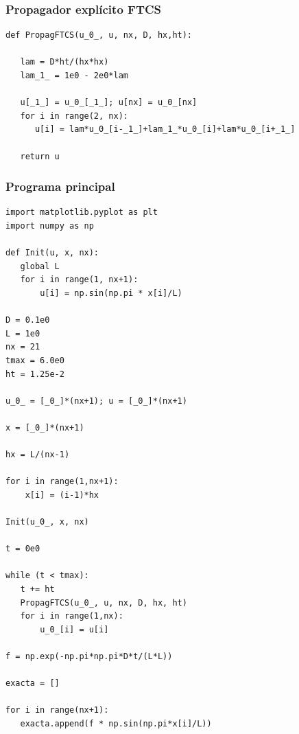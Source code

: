 \documentclass[12pt]{beamer}
\begin{document}
{
\begin{frame}[fragile]
\frametitle{Propagador explícito FTCS}
\begin{lstlisting}[caption=Propagador explícito FTCS para la ecuación de difusión, style=FormattedNumber, basicstyle=\linespread{1.1}\ttfamily=\small, columns=fullflexible]
def PropagFTCS(u_0_, u, nx, D, hx,ht):

   lam = D*ht/(hx*hx) 
   lam_1_ = 1e0 - 2e0*lam

   u[_1_] = u_0_[_1_]; u[nx] = u_0_[nx]
   for i in range(2, nx):
      u[i] = lam*u_0_[i-_1_]+lam_1_*u_0_[i]+lam*u_0_[i+_1_]
      
   return u
\end{lstlisting}
\end{frame}
\begin{frame}
\frametitle{Programa principal}
\begin{lstlisting}[caption=Programa principal para el ejercicio, style=FormattedNumber, basicstyle=\linespread{1.1}\ttfamily=\small, columns=fullflexible]
import matplotlib.pyplot as plt
import numpy as np

def Init(u, x, nx):
   global L
   for i in range(1, nx+1):
       u[i] = np.sin(np.pi * x[i]/L)

D = 0.1e0
L = 1e0
nx = 21
tmax = 6.0e0
ht = 1.25e-2

u_0_ = [_0_]*(nx+1); u = [_0_]*(nx+1)

x = [_0_]*(nx+1)

hx = L/(nx-1)

for i in range(1,nx+1):
    x[i] = (i-1)*hx

Init(u_0_, x, nx)

t = 0e0

while (t < tmax):
   t += ht
   PropagFTCS(u_0_, u, nx, D, hx, ht)
   for i in range(1,nx):
       u_0_[i] = u[i]                  

f = np.exp(-np.pi*np.pi*D*t/(L*L))

exacta = []

for i in range(nx+1):
   exacta.append(f * np.sin(np.pi*x[i]/L))


\end{lstlisting}
\end{frame}}
\end{document}
